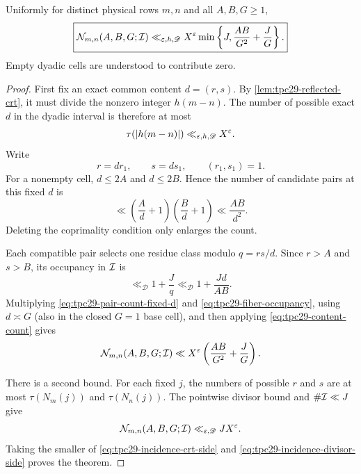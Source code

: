 \begin{theorem}
\label{thm:tpc29-incidence}
Uniformly for distinct physical rows $m,n$ and all $A,B,G\ge1$,
\begin{equation}
 \boxed{
 \mathcal N_{m,n}(A,B,G;\mathcal I)
 \ll_{\varepsilon,h,\mathscr D}X^\varepsilon
 \min\left\{J,\frac{AB}{G^2}+\frac JG\right\}.}
 \label{eq:tpc29-incidence-bound}
\end{equation}
Empty dyadic cells are understood to contribute zero.
\end{theorem}

\begin{proof}
First fix an exact common content $d=(r,s)$.  By
\cref{lem:tpc29-reflected-crt}, it must divide the nonzero integer
$h(m-n)$.  The number of possible exact $d$ in the dyadic interval is
therefore at most
\begin{equation}
 \tau(|h(m-n)|)\ll_{\varepsilon,h,\mathscr D}X^\varepsilon.
 \label{eq:tpc29-content-count}
\end{equation}
Write
\begin{equation}
 r=dr_1,\qquad s=ds_1,\qquad(r_1,s_1)=1.
 \label{eq:tpc29-primitive-parts}
\end{equation}
For a nonempty cell, $d\le2A$ and $d\le2B$.  Hence the number of
candidate pairs at this fixed $d$ is
\begin{equation}
 \ll\left(\frac Ad+1\right)
       \left(\frac Bd+1\right)
 \ll\frac{AB}{d^2}.
 \label{eq:tpc29-pair-count-fixed-d}
\end{equation}
Deleting the coprimality condition only enlarges the count.

Each compatible pair selects one residue class modulo
$q=rs/d$.  Since $r>A$ and $s>B$, its occupancy in $\mathcal I$ is
\begin{equation}
 \ll_{\mathscr D}1+\frac Jq
 \ll_{\mathscr D}1+\frac{Jd}{AB}.
 \label{eq:tpc29-fiber-occupancy}
\end{equation}
Multiplying \eqref{eq:tpc29-pair-count-fixed-d} and
\eqref{eq:tpc29-fiber-occupancy}, using $d\asymp G$ (also in the
closed $G=1$ base cell), and then applying
\eqref{eq:tpc29-content-count} gives
\begin{equation}
 \mathcal N_{m,n}(A,B,G;\mathcal I)
 \ll X^\varepsilon\left(\frac{AB}{G^2}+\frac JG\right).
 \label{eq:tpc29-incidence-crt-side}
\end{equation}

There is a second bound.  For each fixed $j$, the numbers of possible
$r$ and $s$ are at most $\tau(N_m(j))$ and $\tau(N_n(j))$.  The
pointwise divisor bound and $\#\mathcal I\ll J$ give
\begin{equation}
 \mathcal N_{m,n}(A,B,G;\mathcal I)\ll_{\varepsilon,\mathscr D}JX^\varepsilon.
 \label{eq:tpc29-incidence-divisor-side}
\end{equation}
Taking the smaller of \eqref{eq:tpc29-incidence-crt-side} and
\eqref{eq:tpc29-incidence-divisor-side} proves the theorem.
\end{proof}

